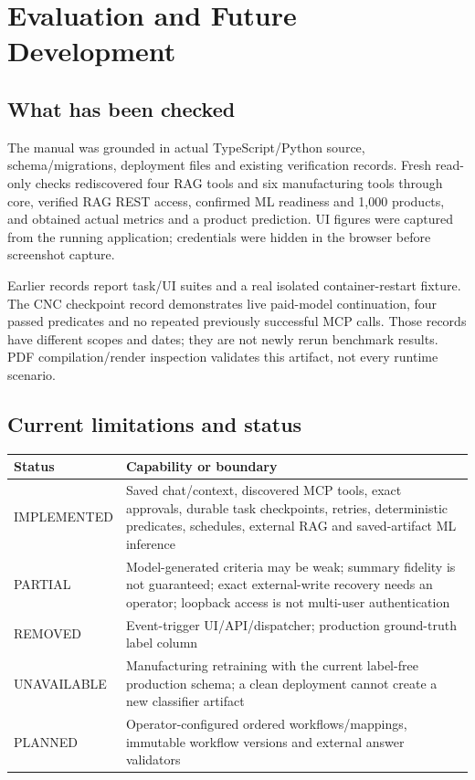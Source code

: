 \chapter{Evaluation and Future Development}
\section{What has been checked}
The manual was grounded in actual TypeScript/Python source, schema/migrations, deployment files and existing verification records. Fresh read-only checks rediscovered four RAG tools and six manufacturing tools through core, verified RAG REST access, confirmed ML readiness and 1,000 products, and obtained actual metrics and a product prediction. UI figures were captured from the running application; credentials were hidden in the browser before screenshot capture.

Earlier records report task/UI suites and a real isolated container-restart fixture. The CNC checkpoint record demonstrates live paid-model continuation, four passed predicates and no repeated previously successful MCP calls. Those records have different scopes and dates; they are not newly rerun benchmark results. PDF compilation/render inspection validates this artifact, not every runtime scenario.
\section{Current limitations and status}
\begin{tabularx}{\linewidth}{@{}lX@{}}\toprule
Status & Capability or boundary\\\midrule
IMPLEMENTED & Saved chat/context, discovered MCP tools, exact approvals, durable task checkpoints, retries, deterministic predicates, schedules, external RAG and saved-artifact ML inference\\
PARTIAL & Model-generated criteria may be weak; summary fidelity is not guaranteed; exact external-write recovery needs an operator; loopback access is not multi-user authentication\\
REMOVED & Event-trigger UI/API/dispatcher; production ground-truth label column\\
UNAVAILABLE & Manufacturing retraining with the current label-free production schema; a clean deployment cannot create a new classifier artifact\\
PLANNED & Operator-configured ordered workflows/mappings, immutable workflow versions and external answer validators\\\bottomrule
\end{tabularx}
